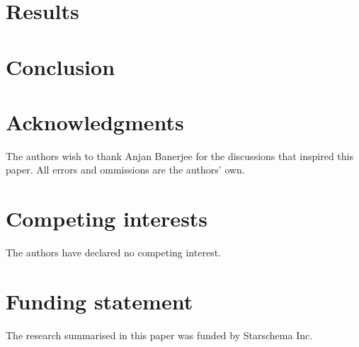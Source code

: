\documentclass[fleqn,10pt]{SelfArx} %
\begin{document}
\section{Results} %
\label{sec:results}


\section{Conclusion} %
\label{sec:conclusion}


\section*{Acknowledgments} %


The authors wish to thank Anjan Banerjee for the discussions that inspired this paper. All errors and ommissions are the authors' own.

\section*{Competing interests} %


The authors have declared no competing interest.

\section*{Funding statement} %


The research summarised in this paper was funded by Starschema Inc.






\end{document}
